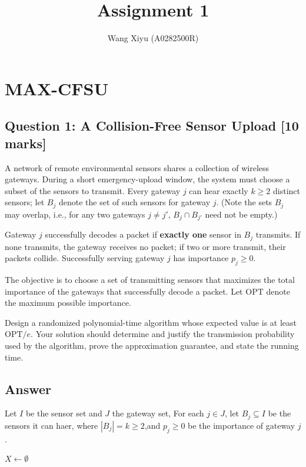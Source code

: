 \documentclass[10pt]{article}
\title{Assignment 1}
\author{Wang Xiyu (A0282500R)}
\date{}
\theoremstyle{definition}
\begin{document}
\maketitle
\tableofcontents
\newpage

\section{MAX-CFSU}
\subsection*{Question 1: A Collision-Free Sensor Upload [10 marks]}

A network of remote environmental sensors shares a collection of wireless gateways. During a short
emergency-upload window, the system must choose a subset of the sensors to transmit. Every
gateway $j$ can hear exactly $k\geq 2$ distinct sensors; let $B_j$ denote the set of such sensors for gateway
$j$. (Note the sets $B_j$ may overlap, i.e., for any two gateways $j\neq j'$, $B_j\cap B_{j'}$ need not be empty.)

Gateway $j$ successfully decodes a packet if \textbf{exactly one} sensor in $B_j$ transmits. If none transmits,
the gateway receives no packet; if two or more transmit, their packets collide. Successfully serving
gateway $j$ has importance $p_j\geq 0$.

The objective is to choose a set of transmitting sensors that maximizes the total importance of the
gateways that successfully decode a packet. Let $\mathrm{OPT}$ denote the maximum possible importance.

Design a randomized polynomial-time algorithm whose expected value is at least $\mathrm{OPT}/e$. Your
solution should determine and justify the transmission probability used by the algorithm, prove the
approximation guarantee, and state the running time.

\subsection*{Answer}
Let $I$ be the sensor set and $J$ the gateway set,
For each $j\in J$, let $B_j\subseteq I$ be the sensors
it can haer, where $|B_j|=k\geq 2$,and $p_j\geq 0$ be the importance of gateway $j$.

\begin{algorithm}[H]
  $X\gets\emptyset$\;
  \;
\end{algorithm}
\end{document}
